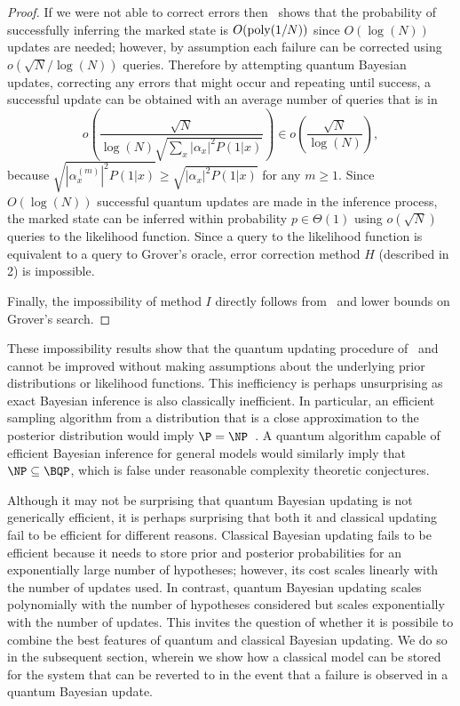 \documentclass[aps,amsmath,onecolumn,amssymb,notitlepage]{revtex4-1}
\begin{document}
\begin{proof}
If we were not able to correct errors then~ shows that the probability of successfully inferring the marked state is $O({\rm poly}(1/N))$ since $O(\log(N))$ updates are needed; however, by assumption each failure can be corrected using $o(\sqrt{N}/\log(N))$ queries.  Therefore by attempting quantum Bayesian updates, correcting any errors that might occur and repeating until success, a successful update can be
obtained with an average number of queries that is in
\begin{equation}
o\left( \frac{\sqrt{N}}{\log(N)\sqrt{\sum_x |\alpha_x|^2 P(1|x)}}\right)\in o\left(\frac{\sqrt{N}}{\log(N)} \right),
\end{equation}
because $\sqrt{|\alpha_x^{(m)}|^2 P(1|x)}\ge \sqrt{|\alpha_x|^2 P(1|x)}$ for any $m\ge 1$.
Since $O(\log(N))$ successful quantum updates are made in the inference process, the marked state can be inferred within probability $p\in \Theta(1)$ using $o(\sqrt{N})$ queries to the likelihood function.  Since a query
to the likelihood function is equivalent to a query to Grover's oracle, error correction method $H$ (described in 2) is impossible.

Finally, the impossibility of method $I$ directly follows from~ and lower bounds on Grover's search.
\end{proof}

These impossibility results show that the quantum updating procedure of~\cite{LYC14} and~ cannot be improved  without making assumptions about the underlying prior distributions or likelihood functions.  This inefficiency is perhaps unsurprising as exact Bayesian inference is also classically inefficient.  In particular, an efficient sampling algorithm from a distribution that is a close approximation to the  posterior distribution would imply $\P=\NP$~\cite{dagum1993approximating}.  A quantum algorithm capable of efficient Bayesian inference for general models would similarly imply that $\NP \subseteq \BQP$, which is false under reasonable complexity theoretic conjectures.

Although it may not be surprising that quantum Bayesian updating is not generically efficient, it is perhaps surprising that both it and classical updating fail to be efficient for different reasons.  Classical Bayesian updating fails to be efficient because it needs to store prior and posterior probabilities for an exponentially large number of hypotheses; however, its cost scales linearly with the number of updates used.  In contrast, quantum Bayesian updating scales polynomially with the number of hypotheses considered but scales exponentially with the number of updates.  This invites the question of whether it is possibile to combine the best features of quantum and classical Bayesian updating.  We do so in the subsequent section, wherein we show how a classical model can be stored for the system that can be reverted to in the event that a failure is observed in a quantum Bayesian update.
\end{document}
